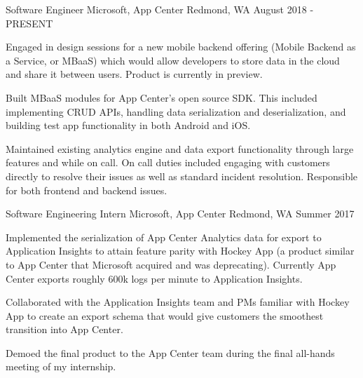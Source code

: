 
\begin{cventries}
 
  \cventry
    {Software Engineer} %
    {Microsoft, App Center} %
    {Redmond, WA} %
    {August 2018 - PRESENT} %
    {
      \begin{cvitems} %
      	\item {Engaged in design sessions for a new mobile backend offering (Mobile Backend as a Service, or MBaaS) which would allow developers to store data in the cloud and share it between users. Product is currently in preview.}
      	\item {Built MBaaS modules for App Center's open source SDK. This included implementing CRUD APIs, handling data serialization and deserialization, and building test app functionality in both Android and iOS.}
        \item {Maintained existing analytics engine and data export functionality through large features and while on call. On call duties included engaging with customers directly to resolve their issues as well as standard incident resolution. Responsible for both frontend and backend issues.}
      \end{cvitems}
    }

  \cventry
    {Software Engineering Intern} %
    {Microsoft, App Center} %
    {Redmond, WA} %
    {Summer 2017} %
    {
      \begin{cvitems} %
      	\item{Implemented the serialization of App Center Analytics data for export to Application Insights to attain feature parity with Hockey App (a product similar to App Center that Microsoft acquired and was deprecating). Currently App Center exports roughly 600k logs per minute to Application Insights.}
      	\item{Collaborated with the Application Insights team and PMs familiar with Hockey App to create an export schema that would give customers the smoothest transition into App Center.}
      	\item{Demoed the final product to the App Center team during the final all-hands meeting of my internship.}
      \end{cvitems}
    }


\end{cventries}
